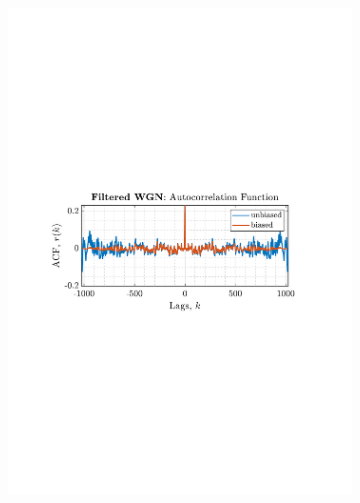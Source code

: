 \documentclass[12pt]{article}
\numberwithin{equation}{section}
\begin{document}
\begin{figure}[H]
\begin{subfigure}{0.49\textwidth}
			\includegraphics[trim={2.2cm 11cm 3.15cm  11.2cm}, clip, width=\textwidth]{../MATLAB/figures/q1_3a_fig06.pdf} 
		\end{subfigure}
		\begin{subfigure}{0.49\textwidth}
			\centering

\end{subfigure}
\end{figure}
\end{document}
